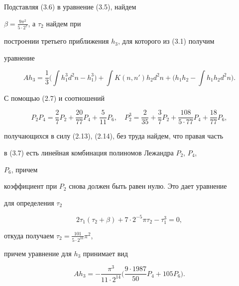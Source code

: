 Подставляя (3.6) в уравнение (3.5), найдем


$\beta=\frac{9\pi^2}{5\cdot 2^7}$, а $\tau_2$ найдем при


построении третьего приближения $h_3$, для которого из (3.1) получим


уравнение


\begin{equation}


Ah_3=\frac{1}{3}\biggl(\int h^3_1d^2n-h^3_1 \biggr)+


\int K(n,n')h_2d^2n+\biggl(h_1h_2-\int h_1h_2d^2n\biggr).


\tag{3.7}


\end{equation}


С помощью (2.7) и соотношений


\begin{equation}


P_2P_4=\frac{2}{7}P_2+\frac{20}{77}P_4+


\frac{5}{11}P_6,\quad P^3_2=\frac{2}{35}+\frac{3}{7}P_2+


\frac{108}{5\cdot 77}P_4+\frac{18}{77}P_6,


\tag{3.8}


\end{equation}


получающихся в силу (2.13), (2.14), без труда найдем, что правая часть


в (3.7) есть линейная комбинация полиномов Лежандра $P_2$, $P_4$,


$P_6$, причем


коэффициент при $P_2$ снова должен быть равен нулю. Это дает уравнение


для определения $\tau_2$


$$


2\tau_1(\tau_2+\beta)+7\cdot 2^{-5}\pi\tau_2-\tau^3_1=0,


$$


откуда получаем $\tau_2=\frac{101}{5\cdot 2^{10}}\pi^2$,


причем уравнение для $h_3$ принимает вид


\begin{equation}


Ah_3=-\frac{\pi^3}{11\cdot 2^{14}}\biggl(\frac{9\cdot 1987}{50}


P_4+105 P_6\biggr).


\tag{3.9}


\end{equation}


